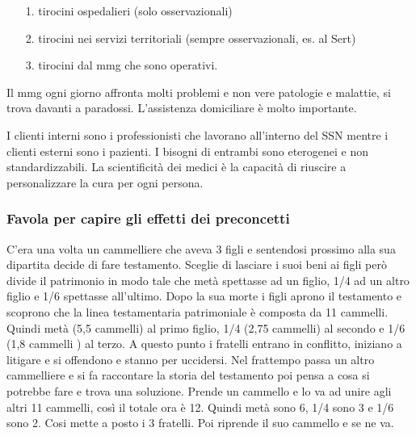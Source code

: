 \begin{itemize}
\item[1.]
  tirocini ospedalieri (solo osservazionali)
\item[2.]
  tirocini nei servizi territoriali (sempre osservazionali, es. al Sert)
\item[3.]
  tirocini dal mmg che sono operativi.
\end{itemize}

Il mmg ogni giorno affronta molti problemi e non vere patologie e
malattie, si trova davanti a paradossi. L'assistenza domiciliare è molto
importante.

I clienti interni sono i professionisti che lavorano all'interno del SSN
mentre i clienti esterni sono i pazienti. I bisogni di entrambi sono
eterogenei e non standardizzabili. La scientificità dei medici è la
capacità di riuscire a personalizzare la cura per ogni persona.

\subsubsection{Favola per capire gli effetti dei preconcetti}

C'era una volta un cammelliere che aveva 3 figli e sentendosi prossimo
alla sua dipartita decide di fare testamento. Sceglie di lasciare i suoi
beni ai figli però divide il patrimonio in modo tale che metà spettasse
ad un figlio, 1/4 ad un altro figlio e 1/6 spettasse all'ultimo. Dopo la
sua morte i figli aprono il testamento e scoprono che la linea
testamentaria patrimoniale è composta da 11 cammelli. Quindi metà (5,5
cammelli) al primo figlio, 1/4 (2,75 cammelli) al secondo e 1/6 (1,8
cammelli ) al terzo. A questo punto i fratelli entrano in conflitto,
iniziano a litigare e si offendono e stanno per uccidersi. Nel frattempo
passa un altro cammelliere e si fa raccontare la storia del testamento
poi pensa a cosa si potrebbe fare e trova una soluzione. Prende un
cammello e lo va ad unire agli altri 11 cammelli, così il totale ora è
12. Quindi metà sono 6, 1/4 sono 3 e 1/6 sono 2. Cosi mette a posto i 3
fratelli. Poi riprende il suo cammello e se ne va.